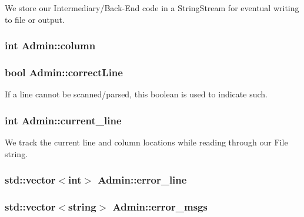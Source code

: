 We store our Intermediary/Back-\/End code in a StringStream for eventual writing to file or output. 

\hypertarget{classAdmin_ae6bcb0d3aa08b938197a332c5af5a456}{
\subsubsection[{column}]{\setlength{\rightskip}{0pt plus 5cm}int {\bf Admin::column}}}
\label{classAdmin_ae6bcb0d3aa08b938197a332c5af5a456}
\hypertarget{classAdmin_a18dd34f91c28721e9ba9ec9370ae5f98}{
\subsubsection[{correctLine}]{\setlength{\rightskip}{0pt plus 5cm}bool {\bf Admin::correctLine}}}
\label{classAdmin_a18dd34f91c28721e9ba9ec9370ae5f98}


If a line cannot be scanned/parsed, this boolean is used to indicate such. 

\hypertarget{classAdmin_a77039c04350669e25d604593a77bea36}{
\subsubsection[{current\_\-line}]{\setlength{\rightskip}{0pt plus 5cm}int {\bf Admin::current\_\-line}}}
\label{classAdmin_a77039c04350669e25d604593a77bea36}


We track the current line and column locations while reading through our File string. 

\hypertarget{classAdmin_a2070f3b7ce2f309da1b080c3d3f07ecf}{
\subsubsection[{error\_\-line}]{\setlength{\rightskip}{0pt plus 5cm}std::vector$<$int$>$ {\bf Admin::error\_\-line}}}
\label{classAdmin_a2070f3b7ce2f309da1b080c3d3f07ecf}
\hypertarget{classAdmin_ad8c946fbb7ed32ad1f73a24eaf422c53}{
\subsubsection[{error\_\-msgs}]{\setlength{\rightskip}{0pt plus 5cm}std::vector$<$string$>$ {\bf Admin::error\_\-msgs}}}
\label{classAdmin_ad8c946fbb7ed32ad1f73a24eaf422c53}


